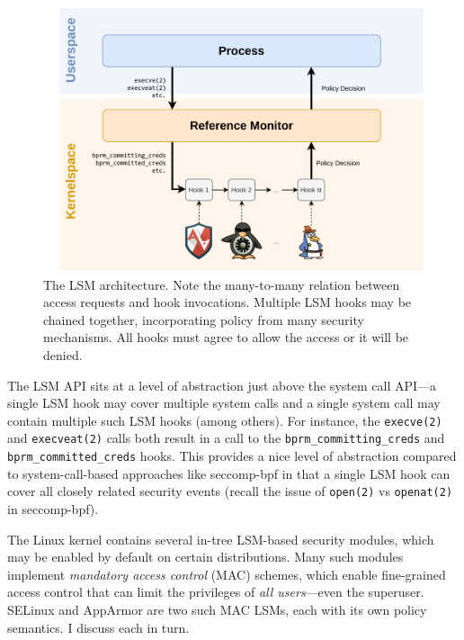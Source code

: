 \begin{figure}[htpb]
    \centering
    \includegraphics[width=0.8\linewidth]{figs/lsm.pdf}
    \caption{The LSM architecture. Note the many-to-many relation between access
    requests and hook invocations. Multiple LSM hooks may be chained together,
    incorporating policy from many security mechanisms. All hooks must agree to
    allow the access or it will be denied.}%
    \label{fig:lsm}
\end{figure}

The LSM API sits at a level of abstraction just above the system call API---a single LSM hook may cover multiple system calls and a single system call may contain multiple such LSM hooks (among others). For instance, the \texttt{execve(2)} and \texttt{execveat(2)} calls both result in a call to the \texttt{bprm\_committing\_creds} and  \texttt{bprm\_committed\_creds} hooks.  This provides a nice level of abstraction compared to system-call-based approaches like seccomp-bpf \cite{seccomp_bpf, drewry2012_seccomp_bpf} in that a single LSM hook can cover all closely related security events (recall the issue of \texttt{open(2)} vs \texttt{openat(2)} in seccomp-bpf).

The Linux kernel contains several in-tree LSM-based security modules, which may be enabled by default on certain distributions.  Many such modules implement \textit{mandatory access control} (MAC) schemes, which enable fine-grained access control that can limit the privileges of \textit{all users}---even the superuser. SELinux \cite{smalley2001_selinux} and AppArmor \cite{cowan2000_apparmor} are two such MAC LSMs, each with its own policy semantics. I discuss each in turn.

